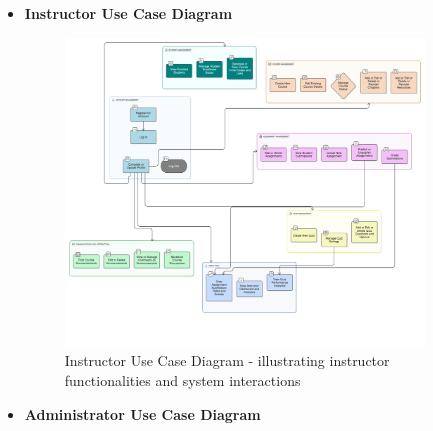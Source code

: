 \documentclass[12pt,a4paper]{article}
\begin{document}
\begin{itemize}
    \clearpage
    \item \textbf{Instructor Use Case Diagram}
    
    \begin{figure}[!htbp]
        \centering
        \includegraphics[width=0.9\textwidth]{instructor-usecase-diagram.png}
        \caption{Instructor Use Case Diagram - illustrating instructor functionalities and system interactions}
        \label{fig:instructor-usecase}
    \end{figure}
    \FloatBarrier
    
    \item \textbf{Administrator Use Case Diagram}
    

\end{itemize}
\end{document}
